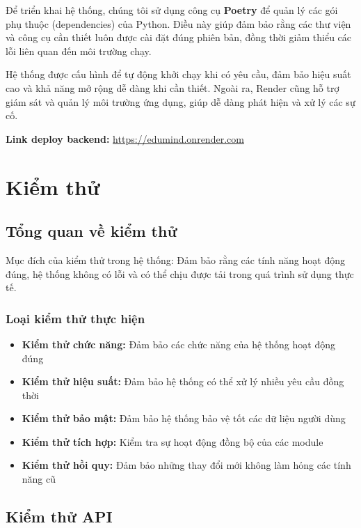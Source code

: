 Để triển khai hệ thống, chúng tôi sử dụng công cụ \textbf{Poetry} để quản lý các gói phụ thuộc (dependencies) của Python. Điều này giúp đảm bảo rằng các thư viện và công cụ cần thiết luôn được cài đặt đúng phiên bản, đồng thời giảm thiểu các lỗi liên quan đến môi trường chạy.

Hệ thống được cấu hình để tự động khởi chạy khi có yêu cầu, đảm bảo hiệu suất cao và khả năng mở rộng dễ dàng khi cần thiết. Ngoài ra, Render cũng hỗ trợ giám sát và quản lý môi trường ứng dụng, giúp dễ dàng phát hiện và xử lý các sự cố.

\par \textbf{Link deploy backend:} \textcolor{blue}{\href{https://edumind.onrender.com}{https://edumind.onrender.com}}



\section{Kiểm thử}

\subsection{Tổng quan về kiểm thử}

Mục đích của kiểm thử trong hệ thống: Đảm bảo rằng các tính năng hoạt động đúng, hệ thống không có lỗi và có thể chịu được tải trong quá trình sử dụng thực tế.

\subsubsection{Loại kiểm thử thực hiện}
\begin{itemize}
    \item \textbf{Kiểm thử chức năng:} Đảm bảo các chức năng của hệ thống hoạt động đúng
    \item \textbf{Kiểm thử hiệu suất:} Đảm bảo hệ thống có thể xử lý nhiều yêu cầu đồng thời
    \item \textbf{Kiểm thử bảo mật:} Đảm bảo hệ thống bảo vệ tốt các dữ liệu người dùng
    \item \textbf{Kiểm thử tích hợp:} Kiểm tra sự hoạt động đồng bộ của các module
    \item \textbf{Kiểm thử hồi quy:} Đảm bảo những thay đổi mới không làm hỏng các tính năng cũ
\end{itemize}

\subsection{Kiểm thử API}

